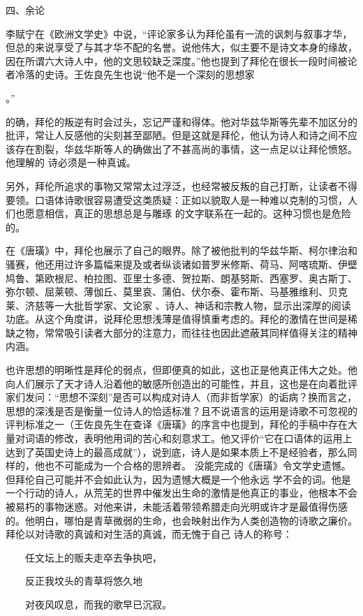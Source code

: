 \documentclass{article}
\begin{document}
四、余论 

李赋宁在《欧洲文学史》中说，“评论家多认为拜伦虽有一流的讽刺与叙事才华，但总的来说享受了与其才华不配的名誉。说他伟大，似主要不是诗文本身的缘故，因在所谓六大诗人中，他的文思较缺乏深度。”他也提到了拜伦在很长一段时间被论者冷落的史诗。王佐良先生也说“他不是一个深刻的思想家

\newpage
。” 

的确，拜伦的叛逆有时会过头，忘记严谨和得体。他对华兹华斯等先辈不加区分的批评，常让人反感他的尖刻甚至鄙陋。但是这就是拜伦，他认为诗人和诗之间不应该存在割裂，华兹华斯等人的确做出了不甚高尚的事情，这一点足以让拜伦愤怒。他理解的
诗必须是一种真诚。 

另外，拜伦所追求的事物又常常太过浮泛，也经常被反叛的自己打断，让读者不得要领。口语体诗歌很容易遭受这类质疑：正如以貌取人是一种难以克制的习惯，人们也愿意相信，真正的思想总是与雕琢
的文字联系在一起的。这种习惯也是危险的。 

在《唐璜》中，拜伦也展示了自己的眼界。除了被他批判的华兹华斯、柯尔律治和骚赛，他还用过许多篇幅来提及或者纵谈诸如普罗米修斯、荷马、阿喀琉斯、伊壁鸠鲁、第欧根尼、柏拉图、亚里士多德、贺拉斯、朗基努斯、西塞罗、奥古斯丁、弥尔顿、屈莱顿、薄伽丘、莫里哀、蒲伯、伏尔泰、霍布斯、马基雅维利、贝克莱、济慈等一大批哲学家、文论家
\newpage
、诗人、神话和宗教人物，显示出深厚的阅读功底。从这个角度讲，说拜伦思想浅薄是值得慎重考虑的。拜伦的激情在世间是稀缺之物，常常吸引读者大部分的注意力，而往往也因此遮蔽其同样值得关注的精神
内涵。 

也许思想的明晰性是拜伦的弱点，但即便真的如此，这也正是他真正伟大之处。他向人们展示了天才诗人沿着他的敏感所创造出的可能性，并且，这也是在向着批评家们发问：“思想不深刻”是否可以构成对诗人（而非哲学家）的诟病？换而言之，思想的深浅是否是衡量一位诗人的恰适标准？且不说语言的运用是诗歌不可忽视的评判标准之一（王佐良先生在查译《唐璜》的序言中也提到，拜伦的手稿中存在大量对词语的修改，表明他用词的苦心和刻意求工。他又评价“它在口语体的运用上达到了英国史诗上的最高成就”），说到底，诗人是如果本质上不是经验者，那么同样的，他也不可能成为一个合格的思辨者。
没能完成的《唐璜》令文学史遗憾。但拜伦自己可能并不会如此认为，因为遗憾大概是一个他永远
\newpage
学不会的词。他是一个行动的诗人，从荒芜的世界中催发出生命的激情是他真正的事业，他根本不会被易朽的事物迷惑。对他来讲，未能活着带领希腊走向光明或许才是最值得伤感的。他明白，哪怕是青草微弱的生命，也会映射出作为人类创造物的诗歌之廉价。拜伦以对诗歌的真诚和对生活的真诚，而无愧于自己
诗人的称号： 


　　任文坛上的贩夫走卒去争执吧， 



　　反正我坟头的青草将悠久地 \par 　　对夜风叹息，而我的歌早已沉寂。
\end{document}
